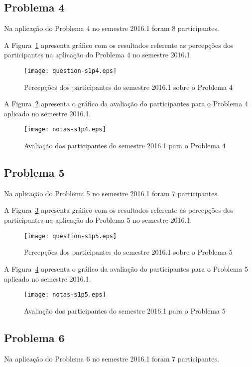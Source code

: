 \subsection{Problema 4}
Na aplicação do Problema 4 no semestre 2016.1 foram 8 participantes.

A Figura~\ref{percep-s1p4} apresenta gráfico com os resultados referente
as percepções dos participantes na aplicação do
Problema 4 no semestre 2016.1.

\begin{figure}[!htb]
\centering
\texttt{[image: question-s1p4.eps]}
\caption{Percepções dos participantes do semestre 2016.1 sobre o Problema 4}
\label{percep-s1p4}
\end{figure}

A Figura~\ref{aval-s1p4} apresenta o gráfico da
avaliação do participantes para o Problema 4 aplicado no semestre 2016.1.

\begin{figure}[!htb]
\centering
\texttt{[image: notas-s1p4.eps]}
\caption{Avaliação dos participantes do semestre 2016.1 para o Problema 4}
\label{aval-s1p4}
\end{figure}

\subsection{Problema 5}
Na aplicação do Problema 5 no semestre 2016.1 foram 7 participantes.

A Figura~\ref{percep-s1p5} apresenta gráfico com os resultados referente
as percepções dos participantes na aplicação do
Problema 5 no semestre 2016.1.
\begin{figure}[!htb]
\centering
\texttt{[image: question-s1p5.eps]}
\caption{Percepções dos participantes do semestre 2016.1 sobre o Problema 5}
\label{percep-s1p5}
\end{figure}

A Figura~\ref{aval-s1p5} apresenta o gráfico da
avaliação do participantes para o Problema 5 aplicado no semestre 2016.1.

\begin{figure}[!htb]
\centering
\texttt{[image: notas-s1p5.eps]}
\caption{Avaliação dos participantes do semestre 2016.1 para o Problema 5}
\label{aval-s1p5}
\end{figure}

\subsection{Problema 6}
Na aplicação do Problema 6 no semestre 2016.1 foram 7 participantes.

